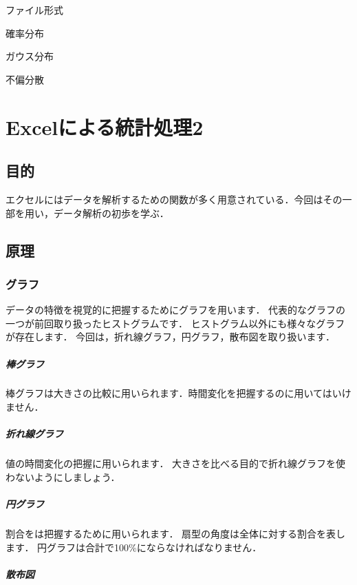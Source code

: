 \documentclass[12pt, a4j]{jreport}
\begin{document}
ファイル形式

確率分布

ガウス分布

不偏分散

\chapter{Excelによる統計処理2}

\section{目的}

エクセルにはデータを解析するための関数が多く用意されている．今回はその一部を用い，データ解析の初歩を学ぶ．

\section{原理}

\subsection{グラフ}

データの特徴を視覚的に把握するためにグラフを用います．
代表的なグラフの一つが前回取り扱ったヒストグラムです．
ヒストグラム以外にも様々なグラフが存在します．
今回は，折れ線グラフ，円グラフ，散布図を取り扱います．

\paragraph{棒グラフ}

棒グラフは大きさの比較に用いられます．時間変化を把握するのに用いてはいけません．

\paragraph{折れ線グラフ}

値の時間変化の把握に用いられます．
大きさを比べる目的で折れ線グラフを使わないようにしましょう．

\paragraph{円グラフ}

割合をは把握するために用いられます．
扇型の角度は全体に対する割合を表します．
円グラフは合計で100\%にならなければなりません．

\paragraph{散布図}
\end{document}

